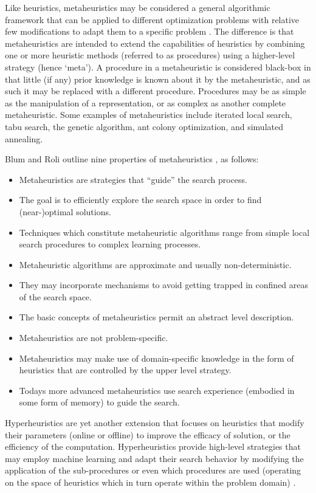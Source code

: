 \begin{bibunit}
Like heuristics, metaheuristics may be considered a general algorithmic framework that can be applied to different optimization problems with relative few modifications to adapt them to a specific problem \cite{Glover2003, Talbi2009}. The difference is that metaheuristics are intended to extend the capabilities of heuristics by combining one or more heuristic methods (referred to as procedures) using a higher-level strategy (hence `meta'). A procedure in a metaheuristic is considered black-box in that little (if any) prior knowledge is known about it by the metaheuristic, and as such it may be replaced with a different procedure. Procedures may be as simple as the manipulation of a representation, or as complex as another complete metaheuristic. Some examples of metaheuristics include iterated local search, tabu search, the genetic algorithm, ant colony optimization, and simulated annealing.

Blum and Roli outline nine properties of metaheuristics \cite{Blum2003}, as follows: 
\begin{itemize}
	\item Metaheuristics are strategies that ``guide'' the search process.
	\item The goal is to efficiently explore the search space in order to find (near-)optimal solutions.
	\item Techniques which constitute metaheuristic algorithms range from simple local search procedures to complex learning processes.
	\item Metaheuristic algorithms are approximate and usually non-deterministic.
	\item They may incorporate mechanisms to avoid getting trapped in confined areas of the search space.
	\item The basic concepts of metaheuristics permit an abstract level description.
	\item Metaheuristics are not problem-specific.
	\item Metaheuristics may make use of domain-specific knowledge in the form of heuristics that are controlled by the upper level strategy.
	\item Todays more advanced metaheuristics use search experience (embodied in some form of memory) to guide the search.
\end{itemize}

Hyperheuristics are yet another extension that focuses on heuristics that modify their parameters (online or offline) to improve the efficacy of solution, or the efficiency of the computation. Hyperheuristics provide high-level strategies that may employ machine learning and adapt their search behavior by modifying the application of the sub-procedures or even which procedures are used (operating on the space of heuristics which in turn operate within the problem domain) \cite{Burke2003a, Burke2003}. 


\end{bibunit}
